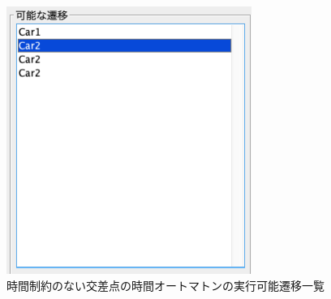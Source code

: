 \documentclass{tpu-sotu}
\begin{document}
	\begin{figure}[htbp]
	\centering
	\includegraphics[width=80mm]{IBSimuTra.png}
	\caption{時間制約のない交差点の時間オートマトンの実行可能遷移一覧}
	\label{IBST}
	\end{figure}
\end{document}
